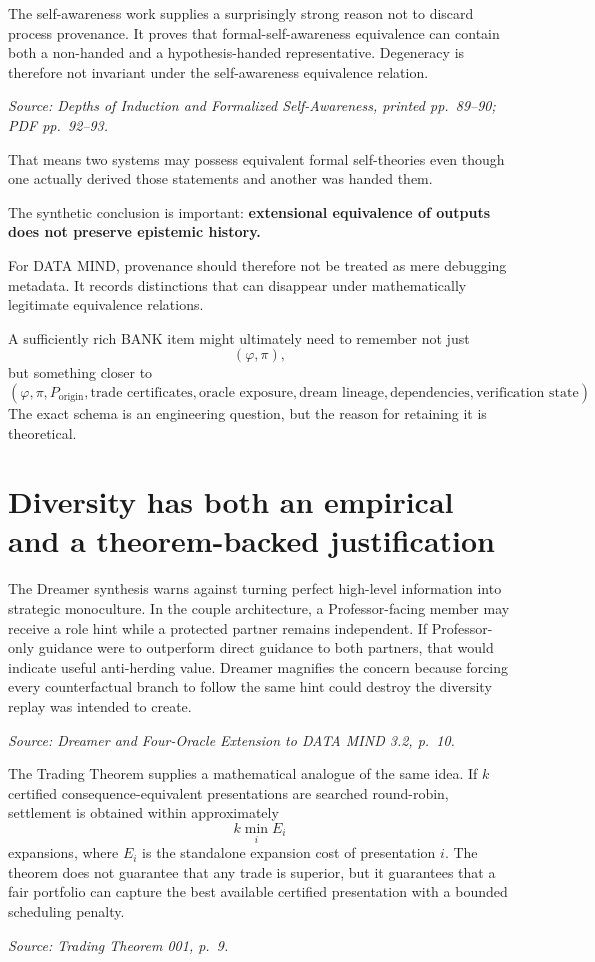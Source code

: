 \documentclass[11pt]{article}
\newcommand{\src}[1]{\par\smallskip\noindent\textit{Source: #1}\normalsize}
\begin{document}
The self-awareness work supplies a surprisingly strong reason not to discard process provenance. It proves that formal-self-awareness equivalence can contain both a non-handed and a hypothesis-handed representative. Degeneracy is therefore not invariant under the self-awareness equivalence relation.
\src{\emph{Depths of Induction and Formalized Self-Awareness}, printed pp.~89--90; PDF pp.~92--93.}

That means two systems may possess equivalent formal self-theories even though one actually derived those statements and another was handed them.

The synthetic conclusion is important: \textbf{extensional equivalence of outputs does not preserve epistemic history.}

For DATA MIND, provenance should therefore not be treated as mere debugging metadata. It records distinctions that can disappear under mathematically legitimate equivalence relations.

A sufficiently rich BANK item might ultimately need to remember not just
\[
(\varphi,\pi),
\]
but something closer to
\[
(\varphi,\pi,
P_{\mathrm{origin}},
\text{trade certificates},
\text{oracle exposure},
\text{dream lineage},
\text{dependencies},
\text{verification state}).
\]
The exact schema is an engineering question, but the reason for retaining it is theoretical.

\section{Diversity has both an empirical and a theorem-backed justification}

The Dreamer synthesis warns against turning perfect high-level information into strategic monoculture. In the couple architecture, a Professor-facing member may receive a role hint while a protected partner remains independent. If Professor-only guidance were to outperform direct guidance to both partners, that would indicate useful anti-herding value. Dreamer magnifies the concern because forcing every counterfactual branch to follow the same hint could destroy the diversity replay was intended to create.
\src{\emph{Dreamer and Four-Oracle Extension to DATA MIND 3.2}, p.~10.}

The Trading Theorem supplies a mathematical analogue of the same idea. If $k$ certified consequence-equivalent presentations are searched round-robin, settlement is obtained within approximately
\[
k\min_i E_i
\]
expansions, where $E_i$ is the standalone expansion cost of presentation $i$. The theorem does not guarantee that any trade is superior, but it guarantees that a fair portfolio can capture the best available certified presentation with a bounded scheduling penalty.
\src{\emph{Trading Theorem 001}, p.~9.}
\end{document}
